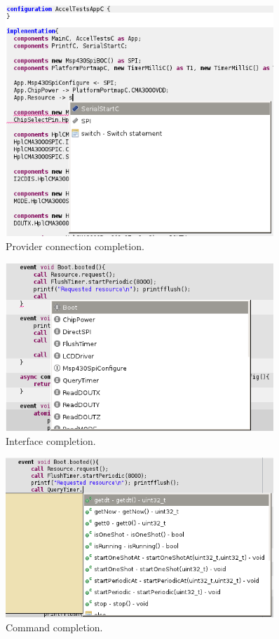 \begin{figure}[h]
  \centering
  \includegraphics[width=0.9\textwidth]{img/eclipse_compl3.png}
  \caption{Provider connection completion.}
\end{figure}

\begin{figure}[h]
  \centering
  \includegraphics[width=0.9\textwidth]{img/eclipse_compl4.png}
  \caption{Interface completion.}
\end{figure}

\begin{figure}[h]
  \centering
  \includegraphics[width=0.9\textwidth]{img/eclipse_compl5.png}
  \caption{Command completion.}
\end{figure}

